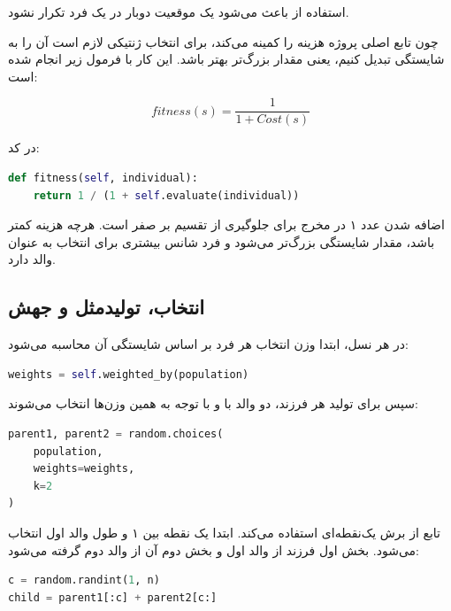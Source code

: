 \documentclass[10.5pt]{exam}
\begin{document}
استفاده از
باعث می‌شود یک موقعیت دوبار در یک فرد تکرار نشود.

چون تابع اصلی پروژه هزینه را کمینه می‌کند، برای انتخاب ژنتیکی لازم است آن را به شایستگی تبدیل کنیم، یعنی مقدار بزرگ‌تر بهتر باشد. این کار با فرمول زیر انجام شده است:

\[
    fitness(s) = \frac{1}{1 + Cost(s)}
\]

در کد:

\begin{latin}
\begin{lstlisting}[language=Python]
def fitness(self, individual):
    return 1 / (1 + self.evaluate(individual))
\end{lstlisting}
\end{latin}

اضافه شدن عدد ۱ در مخرج برای جلوگیری از تقسیم بر صفر است. هرچه هزینه کمتر باشد، مقدار شایستگی بزرگ‌تر می‌شود و فرد شانس بیشتری برای انتخاب به عنوان والد دارد.

\subsection{انتخاب، تولیدمثل و جهش}
در هر نسل، ابتدا وزن انتخاب هر فرد بر اساس شایستگی آن محاسبه می‌شود:

\begin{latin}
\begin{lstlisting}[language=Python]
weights = self.weighted_by(population)
\end{lstlisting}
\end{latin}

سپس برای تولید هر فرزند، دو والد با
و با توجه به همین وزن‌ها انتخاب می‌شوند:

\begin{latin}
\begin{lstlisting}[language=Python]
parent1, parent2 = random.choices(
    population,
    weights=weights,
    k=2
)
\end{lstlisting}
\end{latin}

تابع
از برش یک‌نقطه‌ای استفاده می‌کند. ابتدا یک نقطه
بین ۱ و طول والد اول انتخاب می‌شود. بخش اول فرزند از والد اول و بخش دوم آن از والد دوم گرفته می‌شود:

\begin{latin}
\begin{lstlisting}[language=Python]
c = random.randint(1, n)
child = parent1[:c] + parent2[c:]
\end{lstlisting}
\end{latin}
\end{document}
